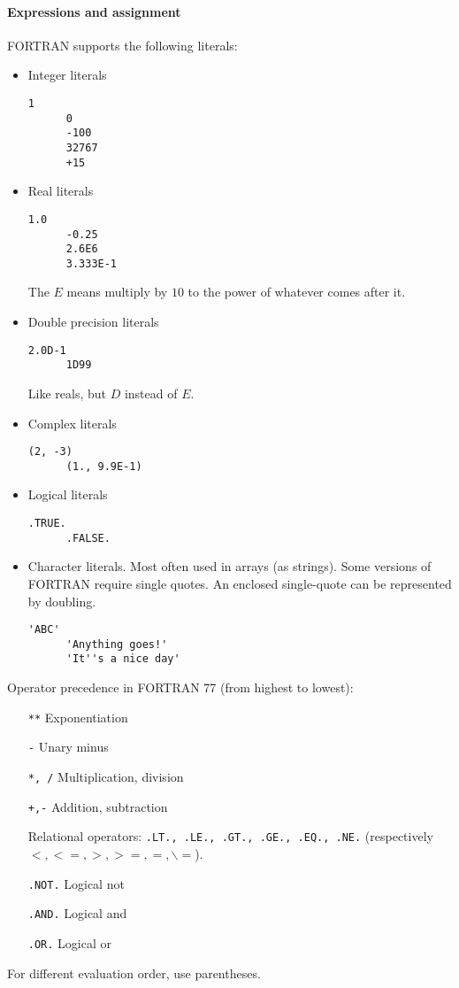 \paragraph{Expressions and assignment}
FORTRAN supports the following literals:
\begin{itemize}
\item Integer literals
\begin{lstlisting}[language={[77]fortran}, style=snippet]
      1
      0
      -100
      32767
      +15
\end{lstlisting}
\item Real literals
\begin{lstlisting}[language={[77]fortran}, style=snippet]
      1.0
      -0.25
      2.6E6
      3.333E-1
\end{lstlisting}
The $E$ means multiply by $10$ to the power of whatever comes after it.
\item Double precision literals
\begin{lstlisting}[language={[77]fortran}, style=snippet]
      2.0D-1
      1D99
\end{lstlisting}
Like reals, but $D$ instead of $E$.
\item Complex literals
\begin{lstlisting}[language={[77]fortran}, style=snippet]
      (2, -3)
      (1., 9.9E-1)
\end{lstlisting}
\item Logical literals
\begin{lstlisting}[language={[77]fortran}, style=snippet]
      .TRUE.
      .FALSE.
\end{lstlisting}
\item Character literals. Most often used in arrays (as strings). Some versions of FORTRAN require single quotes.  An enclosed single-quote can be represented by doubling.
\begin{lstlisting}[language={[77]fortran}, style=snippet]
      'ABC'
      'Anything goes!'
      'It''s a nice day'
\end{lstlisting}
\end{itemize}

Operator precedence in FORTRAN 77 (from highest to lowest):
\begin{enumerate}
\item[\texttt{**}] Exponentiation
\item[\texttt{-}] Unary minus
\item[\texttt{*, /}] Multiplication, division
\item[\texttt{+,-}] Addition, subtraction
\item[] Relational operators: \texttt{.LT., .LE., .GT., .GE., .EQ., .NE.} (respectively $<, <=, >, >=, =, \backslash=$).
\item[\texttt{.NOT.}] Logical not
\item[\texttt{.AND.}] Logical and
\item[\texttt{.OR.}] Logical or
\end{enumerate}
For different evaluation order, use parentheses.

